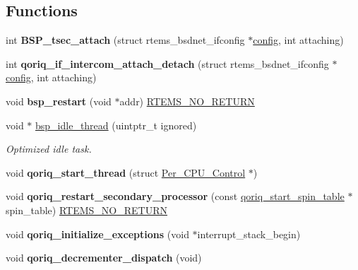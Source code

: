 \subsection*{Functions}
\begin{DoxyCompactItemize}
\item 
\mbox{\label{group__RTEMSBSPsPowerPCQorIQ_ga59edc02dc610b58bf9fb879f63424bdc}} 
int {\bfseries B\+S\+P\+\_\+tsec\+\_\+attach} (struct rtems\+\_\+bsdnet\+\_\+ifconfig $\ast$\mbox{\hyperlink{structconfig__s}{config}}, int attaching)
\item 
\mbox{\label{group__RTEMSBSPsPowerPCQorIQ_gae5bffca5ba917b71a755973d4356039f}} 
int {\bfseries qoriq\+\_\+if\+\_\+intercom\+\_\+attach\+\_\+detach} (struct rtems\+\_\+bsdnet\+\_\+ifconfig $\ast$\mbox{\hyperlink{structconfig__s}{config}}, int attaching)
\item 
\mbox{\label{group__RTEMSBSPsPowerPCQorIQ_ga20f06be1d6abc4fb2d0e988b4e7746ed}} 
void {\bfseries bsp\+\_\+restart} (void $\ast$addr) \mbox{\hyperlink{group__RTEMSScoreBaseDefs_gaa2f0ed67aa174f684bb31b7e8bdb386f}{R\+T\+E\+M\+S\+\_\+\+N\+O\+\_\+\+R\+E\+T\+U\+RN}}
\item 
void $\ast$ \mbox{\hyperlink{group__RTEMSBSPsPowerPCQorIQ_ga301be7085b80c41a9c5887247003c662}{bsp\+\_\+idle\+\_\+thread}} (uintptr\+\_\+t ignored)
\begin{DoxyCompactList}\small\item\em Optimized idle task. \end{DoxyCompactList}\item 
\mbox{\label{group__RTEMSBSPsPowerPCQorIQ_ga741f4e4d8408ff42c72dffd75cba8602}} 
void {\bfseries qoriq\+\_\+start\+\_\+thread} (struct \mbox{\hyperlink{structPer__CPU__Control}{Per\+\_\+\+C\+P\+U\+\_\+\+Control}} $\ast$)
\item 
\mbox{\label{group__RTEMSBSPsPowerPCQorIQ_gaee24f3de33d2de8aafee0ac659d03aca}} 
void {\bfseries qoriq\+\_\+restart\+\_\+secondary\+\_\+processor} (const \mbox{\hyperlink{structqoriq__start__spin__table}{qoriq\+\_\+start\+\_\+spin\+\_\+table}} $\ast$spin\+\_\+table) \mbox{\hyperlink{group__RTEMSScoreBaseDefs_gaa2f0ed67aa174f684bb31b7e8bdb386f}{R\+T\+E\+M\+S\+\_\+\+N\+O\+\_\+\+R\+E\+T\+U\+RN}}
\item 
\mbox{\label{group__RTEMSBSPsPowerPCQorIQ_ga9b9d1a2e6a914a7ba9dc761200eb161e}} 
void {\bfseries qoriq\+\_\+initialize\+\_\+exceptions} (void $\ast$interrupt\+\_\+stack\+\_\+begin)
\item 
\mbox{\label{group__RTEMSBSPsPowerPCQorIQ_ga2b7f28db2a0274eee04f81e435c6fa6b}} 
void {\bfseries qoriq\+\_\+decrementer\+\_\+dispatch} (void)
\end{DoxyCompactItemize}
